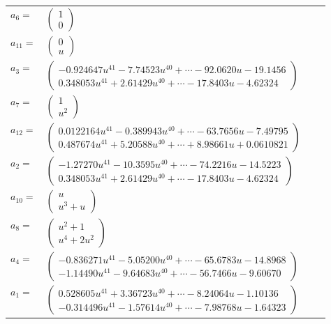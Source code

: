 \documentclass[1p]{elsarticle_modified}
\theoremstyle{definition}
\begin{document}
\begin{tabular}{m{7pt} m{180pt} m{7pt} m{180pt} }
\flushright $a_{6}=$&$\begin{pmatrix}1\\0\end{pmatrix}$ \\
\flushright $a_{11}=$&$\begin{pmatrix}0\\u\end{pmatrix}$ \\
\flushright $a_{3}=$&$\begin{pmatrix}-0.924647 u^{41}-7.74523 u^{40}+\cdots-92.0620 u-19.1456\\0.348053 u^{41}+2.61429 u^{40}+\cdots-17.8403 u-4.62324\end{pmatrix}$ \\
\flushright $a_{7}=$&$\begin{pmatrix}1\\u^2\end{pmatrix}$ \\
\flushright $a_{12}=$&$\begin{pmatrix}0.0122164 u^{41}-0.389943 u^{40}+\cdots-63.7656 u-7.49795\\0.487674 u^{41}+5.20588 u^{40}+\cdots+8.98661 u+0.0610821\end{pmatrix}$ \\
\flushright $a_{2}=$&$\begin{pmatrix}-1.27270 u^{41}-10.3595 u^{40}+\cdots-74.2216 u-14.5223\\0.348053 u^{41}+2.61429 u^{40}+\cdots-17.8403 u-4.62324\end{pmatrix}$ \\
\flushright $a_{10}=$&$\begin{pmatrix}u\\u^3+u\end{pmatrix}$ \\
\flushright $a_{8}=$&$\begin{pmatrix}u^2+1\\u^4+2 u^2\end{pmatrix}$ \\
\flushright $a_{4}=$&$\begin{pmatrix}-0.836271 u^{41}-5.05200 u^{40}+\cdots-65.6783 u-14.8968\\-1.14490 u^{41}-9.64683 u^{40}+\cdots-56.7466 u-9.60670\end{pmatrix}$ \\
\flushright $a_{1}=$&$\begin{pmatrix}0.528605 u^{41}+3.36723 u^{40}+\cdots-8.24064 u-1.10136\\-0.314496 u^{41}-1.57614 u^{40}+\cdots-7.98768 u-1.64323\end{pmatrix}$ \\

\end{tabular}
\end{document}
